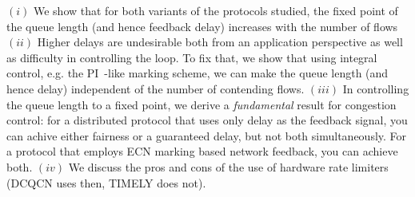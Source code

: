  $(i)$ We show that for both variants of
the protocols studied, the fixed point of the queue length (and hence
feedback delay) increases with the number of flows $(ii)$ Higher
delays are undesirable both from an application perspective as well as
difficulty in controlling the loop. To fix that, we show that using
integral control, e.g. the PI~\cite{Hollot:PIController}-like
marking scheme, we can make 
the queue length (and hence delay) independent of the number of contending
flows. $(iii)$ In controlling the queue length to a fixed point, we
derive a \emph{fundamental} result for congestion control: for a
distributed protocol that uses only delay as the feedback signal, you
can achive either fairness or a guaranteed delay, but not both simultaneously. For a
protocol that employs ECN marking based network feedback, you can
achieve both. $(iv)$ We discuss the pros and cons of the use of hardware rate limiters
(DCQCN uses then, TIMELY does not).

